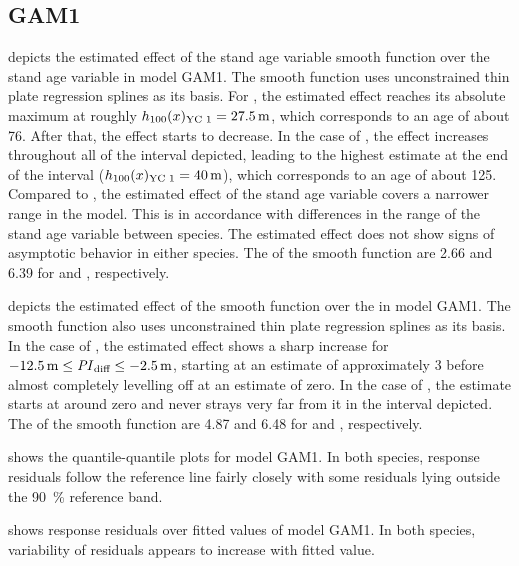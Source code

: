 \subsection{GAM1}

 depicts the estimated effect of the stand age variable smooth function over the stand age variable in model GAM1.  The smooth function uses unconstrained thin plate regression splines as its basis.
For \Beech{}, the estimated effect reaches its absolute maximum at roughly \(h_{100}(x)_{\text{YC 1}}{} = \SI{27.5}{\meter}\), which corresponds to an age of about \SI{76}{\year}.  After that, the effect starts to decrease.  In the case of \Spruce{}, the effect increases throughout all of the interval depicted, leading to the highest estimate at the end of the interval (\(h_{100}(x)_{\text{YC 1}}{} = \SI{40}{\meter}\)), which corresponds to an age of about \SI{125}{\year}.  Compared to \Spruce{}, the estimated effect of the stand age variable covers a narrower range in the \Beech{} model.  This is in accordance with differences in the range of the stand age variable between species.  The estimated effect does not show signs of asymptotic behavior in either species.  The \edf{} of the smooth function are \num{2.66} and \num{6.39} for \Beech{} and \Spruce{}, respectively.

 depicts the estimated effect of the \ProductivityIndexVariableText{} smooth function over the \ProductivityIndexVariableText{} in model GAM1.  The smooth function also uses unconstrained thin plate regression splines as its basis.  In the case of \Beech{}, the estimated effect shows a sharp increase for \(\SI{-12.5}{\meter} \leq \mathit{PI}_{\text{diff}}{} \leq \SI{-2.5}{\meter}\), starting at an estimate of approximately \num{3} before almost completely levelling off at an estimate of zero.  In the case of \Spruce{}, the estimate starts at around zero and never strays very far from it in the interval depicted.  The \edf{} of the smooth function are \num{4.87} and \num{6.48} for \Beech{} and \Spruce{}, respectively.

 shows the quantile-quantile plots for model GAM1.  In both species, response residuals follow the reference line fairly closely with some residuals lying outside the \SI{90}{\percent} reference band.

 shows response residuals over fitted values of model GAM1.  In both species, variability of residuals appears to increase with fitted value.

